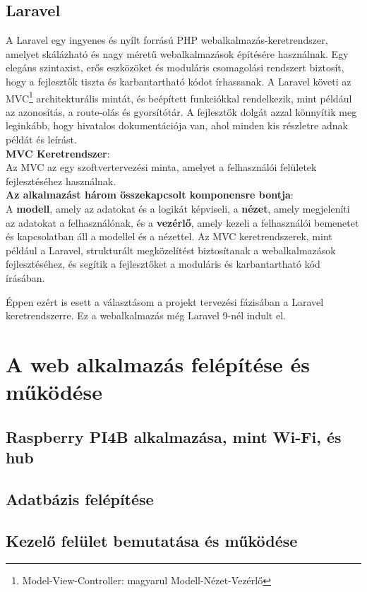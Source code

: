 \documentclass[
]{thesis-ekf}
\theoremstyle{definition}
\theoremstyle{remark}
\begin{document}
	\section{Laravel}
	A Laravel egy ingyenes és nyílt forrású PHP webalkalmazás-keretrendszer, amelyet skálázható és nagy méretű webalkalmazások építésére használnak. Egy elegáns szintaxist, erős eszközöket és moduláris csomagolási rendszert biztosít, hogy a fejlesztők tiszta és karbantartható kódot írhassanak. A Laravel követi az MVC\footnote{Model-View-Controller: magyarul Modell-Nézet-Vezérlő} architekturális mintát, és beépített funkciókkal rendelkezik, mint például az azonosítás, a route-olás és gyorsítótár.\cite{laravel-intro}
	A fejlesztők dolgát azzal könnyítik meg leginkább, hogy hivatalos dokumentációja van, ahol minden kis részletre adnak példát és leírást.\cite{laravel-docs}\\
	\textbf{MVC Keretrendszer}:\\
	Az MVC az egy szoftvertervezési minta, amelyet a felhasználói felületek fejlesztéséhez használnak. \\
	\textbf{Az alkalmazást három összekapcsolt komponensre bontja}:\\A \textbf{modell}, amely az adatokat és a logikát képviseli, a \textbf{nézet}, amely megjeleníti az adatokat a felhasználónak, és a \textbf{vezérlő}, amely kezeli a felhasználói bemenetet és kapcsolatban áll a modellel és a nézettel. Az MVC keretrendszerek, mint például a Laravel, strukturált megközelítést biztosítanak a webalkalmazások fejlesztéséhez, és segítik a fejlesztőket a moduláris és karbantartható kód írásában.
	
	Éppen ezért is esett a választásom a projekt tervezési fázisában a Laravel keretrendszerre. Ez a webalkalmazás még Laravel 9-nél indult el.
	
	\chapter{A web alkalmazás felépítése és működése}
	\section{Raspberry PI4B alkalmazása, mint Wi-Fi, és hub}
	\section{Adatbázis felépítése}\label{database}
	\section{Kezelő felület bemutatása és működése}
\end{document}
